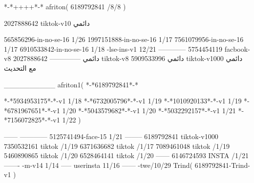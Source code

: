 *-*++++*-*
afriton(
6189792841 /8/8
)

2027888642 tiktok-v10
دائمي

565856296-in-no-se-16 1/26
1997151888-in-no-se-16 1/17
7561079956-in-no-se-16 1/17
6910533842-in-no-se-16 1/18
-lse-ins-v1 12/21
------------
5754454119 facbook-v8
دائمي
--------------
2027888642 tiktok-v8
دائمي
5909533996 tiktok-v1000
دائمي مع التحديث

__________
afriton1(
*-*6189792841*-*


*-*5934953175*-*-v1 1/18
*-*6732005796*-*-v1 1/19
*-*1010920133*-*-v1 1/19
*-*6781967651*-*-v1 1/20
*-*5043579682*-*-v1 1/20
*-*5032292157*-*-v1 1/21
*-*7156072825*-*-v1 1/22
)

------
------------
5125741494-face-15 1/21
--------
6189792841 tiktok-v1000
7350532161 tiktok /1/19
6371636682 tiktok /1/17
7089461048 tiktok /1/19
5460890865 tiktok /1/20
6528464141 tiktok /1/20
------
6146724593 INSTA /1/21
-------
-m-v14 1/14
-----
userinsta 11/16
------
-twe/10/29
Trind(
6189792841-Trind-v1 
)
